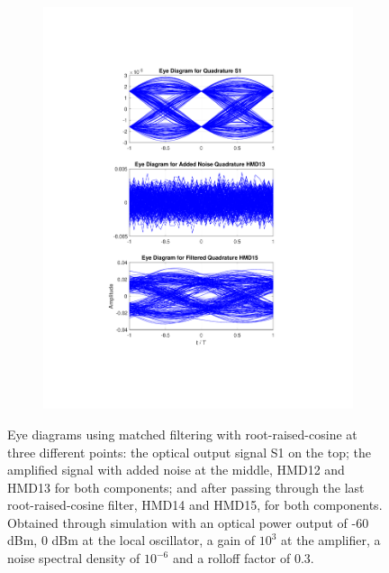 \begin{figure}[H]
\begin{subfigure}{.45\textwidth}
		\includegraphics[clip, trim=5cm 4cm 5cm 4cm, width=\textwidth]{./sdf/m_qam_system/figures/eyes/q_n_p_60_03_rc.pdf}
	\end{subfigure}
	
	\caption{Eye diagrams using matched filtering with root-raised-cosine at three different points: the optical output signal S1 on the top; the amplified signal with added noise at the middle, HMD12 and HMD13 for both components; and after passing through the last root-raised-cosine filter, HMD14 and HMD15, for both components. Obtained through simulation with an optical power output of -60 dBm, 0 dBm at the local oscillator, a gain of $10^3$ at the amplifier, a noise spectral density of $10^{-6}$ and a rolloff factor of 0.3.\label{fig:eyes_n_rc_60_03}}
	
\end{figure}

